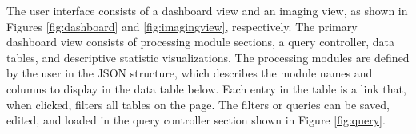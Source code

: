 The user interface consists of a dashboard view and an imaging view, as shown in Figures \ref{fig:dashboard} and \ref{fig:imagingview}, respectively. The primary dashboard view consists of processing module sections, a query controller, data tables, and descriptive statistic visualizations. The processing modules are defined by the user in the JSON structure, which describes the module names and columns to display in the data table below. Each entry in the table is a link that, when clicked, filters all tables on the page. The filters or queries can be saved, edited, and loaded in the query controller section shown in Figure \ref{fig:query}. 